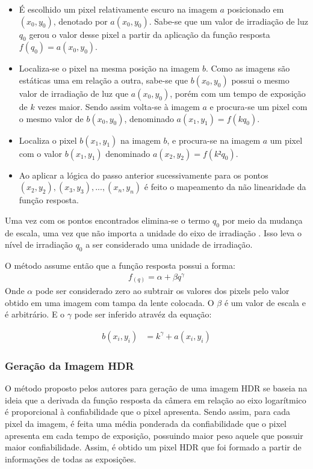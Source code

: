 \begin{itemize}
\item É escolhido um pixel relativamente escuro na imagem $a$ posicionado em $(x_{0}, y_{0})$, denotado por $a(x_{0},y_{0})$. Sabe-se que um valor de irradiação de luz $q_{0}$ gerou o valor desse pixel a partir da aplicação da função resposta $f(q_{0}) = a(x_{0}, y_{0})$. 
\item Localiza-se o pixel na mesma posição na imagem $b$. Como as imagens são estáticas uma em relação a outra, sabe-se que $b(x_{0}, y_{0})$ possui o mesmo valor de irradiação de luz que $a(x_{0}, y_{0})$, porém com um tempo de exposição de $k$ vezes maior. Sendo assim volta-se à imagem $a$ e procura-se um pixel com o mesmo valor de $b(x_{0}, y_{0})$, denominado $a(x_{1}, y_{1}) = f(kq_{0})$.
\item Localiza o pixel $b(x_{1},y_{1})$ na imagem $b$, e procura-se na imagem $a$ um pixel com o valor $b(x_1,y_1)$ denominado $a(x_2, y_2) = f(k² q_0)$.
\item Ao aplicar a lógica do passo anterior sucessivamente para os pontos $(x_2, y_2), (x_3, y_3), ... , (x_n, y_n)$ é feito o mapeamento da não linearidade da função resposta.
\end{itemize}
Uma vez com os pontos encontrados elimina-se o termo $q_{0}$ por meio da mudança de escala, uma vez que não importa a unidade do eixo de irradiação \cite{mann}. Isso leva o nível de irradiação $q_{0}$ a ser considerado uma unidade de irradiação.

O método assume então que a função resposta possui a forma:
\begin{align} \label{eqMannTotal}
	f_{(q)} = \alpha + \beta q ^ \gamma
\end{align}
 Onde $\alpha$ pode ser considerado zero ao subtrair os valores dos pixels pelo valor obtido em uma imagem com tampa da lente colocada. O $\beta$ é um valor de escala e é arbitrário. E o $\gamma$ pode ser inferido atravéz da equação:
	
\begin{align} \label{eqMannGama}
          b(x_{i},y_{i}) &= k^\gamma + a(x_{i},y_{i})
\end{align}


\subsubsection{Geração da Imagem HDR} \label{metodoMannGeracao}

O método proposto pelos autores para geração de uma imagem HDR se baseia na ideia que a derivada da função resposta da câmera em relação ao eixo logarítmico é proporcional à confiabilidade que o pixel apresenta. Sendo assim, para cada pixel da imagem, é feita uma média ponderada da confiabilidade que o pixel apresenta em cada tempo de exposição, possuindo maior peso aquele que possuir maior confiabilidade. Assim, é obtido um pixel HDR que foi formado a partir de informações de todas as exposições.

